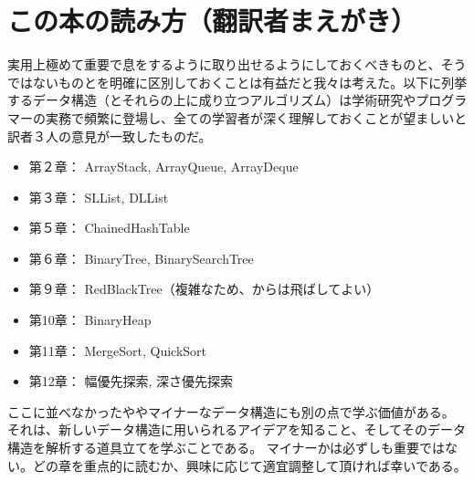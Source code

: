 \chapter*{この本の読み方（翻訳者まえがき）}

実用上極めて重要で息をするように取り出せるようにしておくべきものと、そうではないものとを明確に区別しておくことは有益だと我々は考えた。以下に列挙するデータ構造（とそれらの上に成り立つアルゴリズム）は学術研究やプログラマーの実務で頻繁に登場し、全ての学習者が深く理解しておくことが望ましいと訳者３人の意見が一致したものだ。

\begin{itemize}
  \item 第２章： ArrayStack, ArrayQueue, ArrayDeque
  \item 第３章： SLList, DLList
  \item 第５章： ChainedHashTable
  \item 第６章： BinaryTree, BinarySearchTree
  \item 第９章： RedBlackTree（複雑なため、からは飛ばしてよい）
  \item 第10章： BinaryHeap
  \item 第11章： MergeSort, QuickSort
  \item 第12章： 幅優先探索, 深さ優先探索
\end{itemize}

ここに並べなかったややマイナーなデータ構造にも別の点で学ぶ価値がある。
それは、新しいデータ構造に用いられるアイデアを知ること、そしてそのデータ構造を解析する道具立てを学ぶことである。
マイナーかは必ずしも重要ではない。どの章を重点的に読むか、興味に応じて適宜調整して頂ければ幸いである。

